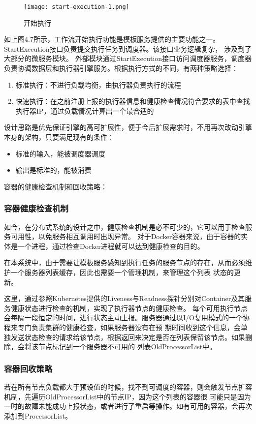 \begin{figure}[H]
\centering
\texttt{[image: start-execution-1.png]}
\caption{开始执行}
\label{fig:kszx}
\end{figure}

如上图4.7所示，工作流开始执行功能是模板服务提供的主要功能之一。StartExecution接口负责提交执行任务到调度器。该接口业务逻辑复杂，
涉及到了大部分的微服务模块。 外部模块通过StartExecution接口访问调度器服务，调度器负责协调数据层和执行器引擎服务。根据执行方式的不同，有两种策略选择：

\begin{enumerate}
    \item 标准执行：不进行负载均衡，由执行器负责执行的流程
    \item 快速执行：在之前注册上报的执行器信息和健康检查情况符合要求的表中查找执行器IP，通过负载情况计算出一个最合适的
\end{enumerate}


设计思路是优先保证引擎的高可扩展性，便于今后扩展需求时，不用再次改动引擎本身的架构，只要满足现有的条件：
\begin{itemize}
    \item 标准的输入，能被调度器调度
    \item 输出是标准的，能被消费
\end{itemize}

容器的健康检查机制和回收策略：
\subsubsection{容器健康检查机制}

如今，在分布式系统的设计之中，健康检查机制是必不可少的，它可以用于检查服务可用性，以免服务相互调用时出现异常。
对于Docker容器来说，由于容器的实体是一个进程，通过检查Docker进程就可以达到健康检查的目的\cite{zw1}。

在本系统中，由于需要让模板服务感知到执行任务的服务节点的存在，从而必须维护一个服务器列表缓存，因此也需要一个管理机制，来管理这个列表
状态的更新。

这里，通过参照Kubernetes提供的Liveness与Readness探针分别对Container及其服务健康状态进行检查的机制\cite{wfwr442}，实现了执行器节点的健康检查。
每个可用执行节点会每隔一段恒定的时间，进行状态主动上报。服务器通过以I/O复用模式的一个协程来专门负责集群的健康检查，如果服务器没有在预
期时间收到这个信息，会单独发送状态检查的请求给该节点，根据返回来决定是否在列表保留该节点。如果删除，会将该节点标记到一个服务器不可用的
列表OldProcessorList中\cite{zw2}。

\subsubsection{容器回收策略}
若在所有节点负载都大于预设值的时候，找不到可调度的容器，则会触发节点扩容机制，先遍历OldProcessorList中的节点IP，因为这个列表的容器很
可能只是因为一时的故障未能成功上报状态，或者进行了重启等操作。如有可用的容器，会再次添加到ProcessorList\cite{lamprecht2021reinforcement}。

